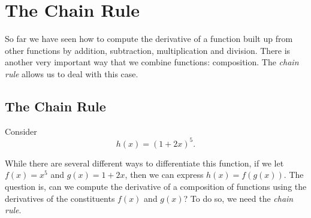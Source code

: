 \chapter{The Chain Rule}




So far we have seen how to compute the derivative of a function built
up from other functions by addition, subtraction, multiplication and
division. There is another very important way that we combine
functions: composition. The \textit{chain rule} allows us to deal with
this case.

\section{The Chain Rule}


Consider
\[
h(x) = (1+2x)^5.
\] 

While there are several different ways to differentiate this function,
if we let $f(x) = x^5$ and $g(x) = 1+2x$, then we can express $h(x) =
f(g(x))$. The question is, can we compute the derivative of a
composition of functions using the derivatives of the constituents
$f(x)$ and $g(x)$? To do so, we need the \textit{chain rule}.

